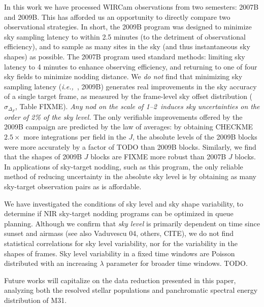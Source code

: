 \documentclass[iop]{emulateapj}
\newcommand{\ie}{\textit{i.e.,~}}
\begin{document}
In this work we have processed WIRCam observations from two semesters: 2007B and 2009B. This has afforded us an opportunity to directly compare two observational strategies. In short, the 2009B program was designed to minimize sky sampling latency to within 2.5 minutes (to the detriment of observational efficiency), and to sample as many sites in the sky (and thus instantaneous sky shapes) as possible. The 2007B program used standard methods: limiting sky latency to 4 minutes to enhance observing efficiency, and returning to one of four sky fields to minimize nodding distance. We \emph{do not} find that minimizing sky sampling latency (\ie, 2009B) generates real improvements in the sky accuracy of a single target frame, as measured by the frame-level sky offset distribution ($\sigma_{\Delta_F}$, Table FIXME). \emph{Any nod on the scale of 1\arcdeg --2\arcdeg\ induces sky uncertainties on the order of 2\% of the sky level.} The only verifiable improvements offered by the 2009B campaign are predicted by the law of averages: by  obtaining CHECKME $2.5\times$ more integrations per field in the $J$, the absolute levels of the 2009B blocks were more accurately by a factor of TODO than 2009B blocks. Similarly, we find that the shapes of 2009B $J$ blocks are FIXME more robust than 2007B $J$ blocks. In applications of sky-target nodding, such as this program, the only reliable method of reducing uncertainty in the absolute sky level is by obtaining as many sky-target observation pairs as is affordable.

We have investigated the conditions of sky level and sky shape variability, to determine if NIR sky-target nodding programs can be optimized in queue planning. Although we confirm that \emph{sky level} is primarily dependent on time since sunset and airmass (see also Vaduvescu 04, others, CITE), we do not find statistical correlations for sky level variability, nor for the variability in the shapes of frames. Sky level variability in a fixed time windows are Poisson distributed with an increasing $\lambda$ parameter for broader time windows. TODO.

Future works will capitalize on the data reduction presented in this paper, analyzing both the resolved stellar populations and panchromatic spectral energy distribution of M31.


\end{document}
